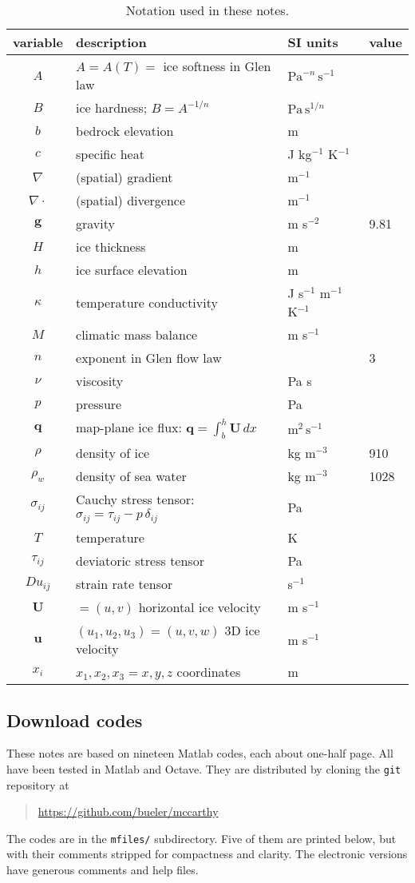\documentclass[letterpaper,final,12pt,reqno]{amsart}
\newcommand{\bq}{\mathbf{q}}
\newcommand{\bU}{\mathbf{U}}
\begin{document}
\begin{table}[ht]
\caption{Notation used in these notes.}
\begin{tabular}{clll}
variable  & description & SI units & value \\
\hline
$A$ & $A=A(T)=$ ice softness in Glen law & $\text{Pa}^{-n}\,\text{s}^{-1}$ \\
$B$ & ice hardness; $B=A^{-1/n}$ & $\text{Pa}\,\text{s}^{1/n}$ \\
$b$ & bedrock elevation & m \\
$c$ & specific heat & J kg$^{-1}$ K$^{-1}$ \\
$\nabla$ & (spatial) gradient & m$^{-1}$ \\
$\nabla\cdot$ & (spatial) divergence & m$^{-1}$ \\
$\mathbf{g}$ & gravity & m s$^{-2}$\phantom{foobar} & 9.81 \\
$H$ & ice thickness & m \\
$h$ & ice surface elevation & m \\
$\kappa$ & temperature conductivity & J s$^{-1}$ m$^{-1}$ K$^{-1}$ \\
$M$ & climatic mass balance & m s$^{-1}$ \\
$n$ & exponent in Glen flow law & & 3 \\
$\nu$ & viscosity & Pa s \\
$p$ & pressure & Pa \\
$\bq$ & map-plane ice flux: $\bq = \int_{b}^{h} \bU\,dx$ & $\text{m}^2\,\text{s}^{-1}$ \\
$\rho$ & density of ice & kg m$^{-3}$ & 910 \\
$\rho_w$ & density of sea water & kg m$^{-3}$ & 1028 \\
$\sigma_{ij}$ & Cauchy stress tensor: $\sigma_{ij} = \tau_{ij} - p\, \delta_{ij}$ & Pa \\
$T$ & temperature & K \\
$\tau_{ij}$ & deviatoric stress tensor & Pa \\
$Du_{ij}$ & strain rate tensor & s$^{-1}$ \\
$\mathbf{U}$ & $=(u,v)$ horizontal ice velocity & m s$^{-1}$ \\
$\mathbf{u}$ & $(u_1,u_2,u_3)=(u,v,w)$ 3D ice velocity & m s$^{-1}$ \\
$x_i$ & $x_1,x_2,x_3=x,y,z$ coordinates & m
\end{tabular}
\label{tab:notation}
\end{table}

\subsection*{Download codes}  These notes are based on nineteen Matlab codes, each about one-half page.  All have been tested in Matlab and Octave.  They are distributed by cloning the \texttt{git} repository at
\begin{quote}
\url{https://github.com/bueler/mccarthy}
\end{quote}
\noindent The codes are in the \texttt{mfiles/} subdirectory.  Five of them are printed below, but with their comments stripped for compactness and clarity.  The electronic versions have generous comments and help files.
\end{document}
